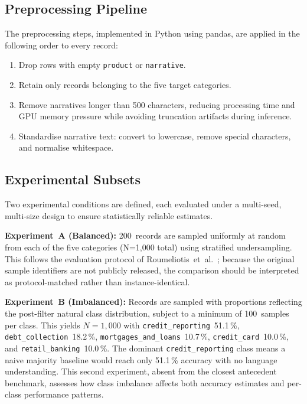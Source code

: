 \documentclass[journal]{IEEEtran}
\begin{document}
\subsection{Preprocessing Pipeline}

The preprocessing steps, implemented in Python using pandas, are applied
in the following order to every record:

\begin{enumerate}
  \item Drop rows with empty \texttt{product} or \texttt{narrative}.
  \item Retain only records belonging to the five target categories.
  \item Remove narratives longer than 500 characters, reducing processing
        time and GPU memory pressure while avoiding truncation artifacts
        during inference.
  \item Standardise narrative text: convert to lowercase, remove special
        characters, and normalise whitespace.
\end{enumerate}

\subsection{Experimental Subsets}

Two experimental conditions are defined, each evaluated under a
multi-seed, multi-size design to ensure statistically reliable estimates.

\textbf{Experiment~A (Balanced):} 200~records are sampled uniformly at
random from each of the five categories (N=1,000 total) using
stratified undersampling.
This follows the evaluation protocol of
Roumeliotis~et~al.\ \cite{roumeliotis2025think}; because the original
sample identifiers are not publicly released, the comparison should be
interpreted as protocol-matched rather than instance-identical.

\textbf{Experiment~B (Imbalanced):} Records are sampled with proportions
reflecting the post-filter natural class distribution, subject to a
minimum of 100~samples per class. This yields $N{=}1{,}000$ with
\texttt{credit\_reporting}~51.1\,\%,
\texttt{debt\_collection}~18.2\,\%,
\texttt{mortgages\_and\_loans}~10.7\,\%,
\texttt{credit\_card}~10.0\,\%, and
\texttt{retail\_banking}~10.0\,\%.
The dominant \texttt{credit\_reporting} class means a naive majority
baseline would reach only 51.1\,\% accuracy with no language understanding.
This second experiment, absent from the closest antecedent benchmark,
assesses how class imbalance affects both accuracy estimates and
per-class performance patterns.
\end{document}
